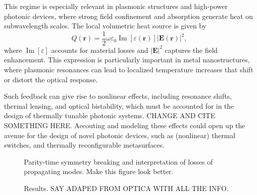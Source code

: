 This regime is especially relevant in plasmonic structures and high-power photonic devices, where strong field confinement and absorption generate heat on subwavelength scales. The local volumetric heat source is given by~\cite{plasm_heat_source}
\[
Q(\mathbf{r}) = \frac{1}{2} \omega \varepsilon_0 \operatorname{Im}[\varepsilon(\mathbf{r})] |\mathbf{E}(\mathbf{r})|^2,
\]
where $\operatorname{Im}[\varepsilon]$ accounts for material losses and $|\mathbf{E}|^2$ captures the field enhancement. This expression is particularly important in metal nanostructures, where plasmonic resonances can lead to localized temperature increases that shift or distort the optical response.

Such feedback can give rise to nonlinear effects, including resonance shifts, thermal lensing, and optical bistability, which must be accounted for in the design of thermally tunable photonic systems. CHANGE AND CITE SOMETHING HERE. Accouting and modeling
these effects could open up the avenue for the design of novel photonic devices, such as (nonlinear) thermal switches,  and thermally reconfigurable metasurfaces.

\begin{figure}[tb]
    \centering
    \caption{Parity-time symmetry breaking and interpretation of losses of propagating modes. Make this figure look better.}
    \label{fig:thermo_opt}
\end{figure}

\begin{figure}[tb]
    \centering
    \caption{Results. SAY ADAPED FROM OPTICA WITH ALL THE INFO.}
    \label{fig:thermo_res}
\end{figure}

